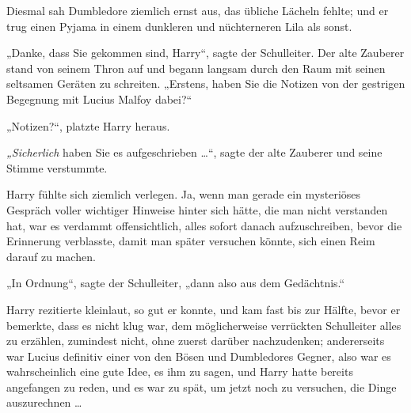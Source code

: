 Diesmal sah Dumbledore ziemlich ernst aus, das übliche Lächeln fehlte; und er trug einen Pyjama in einem dunkleren und nüchterneren Lila als sonst.

„Danke, dass Sie gekommen sind, Harry“, sagte der Schulleiter. Der alte Zauberer stand von seinem Thron auf und begann langsam durch den Raum mit seinen seltsamen Geräten zu schreiten.
„Erstens, haben Sie die Notizen von der gestrigen Begegnung mit Lucius Malfoy dabei?“

„Notizen?“, platzte Harry heraus.

\emph{„Sicherlich} haben Sie es aufgeschrieben …“, sagte der alte Zauberer und seine Stimme verstummte.

Harry fühlte sich ziemlich verlegen. Ja, wenn man gerade ein mysteriöses Gespräch voller wichtiger Hinweise hinter sich hätte, die man nicht verstanden hat, war es verdammt offensichtlich, alles sofort danach aufzuschreiben, bevor die Erinnerung verblasste, damit man später versuchen könnte, sich einen Reim darauf zu machen.

„In Ordnung“, sagte der Schulleiter, „dann also aus dem Gedächtnis.“

Harry rezitierte kleinlaut, so gut er konnte, und kam fast bis zur Hälfte, bevor er bemerkte, dass es nicht klug war, dem möglicherweise verrückten Schulleiter alles zu erzählen, zumindest nicht, ohne zuerst darüber nachzudenken; andererseits war Lucius definitiv einer von den Bösen und Dumbledores Gegner, also war es wahrscheinlich eine gute Idee, es ihm zu sagen, und Harry hatte bereits angefangen zu reden, und es war zu spät, um jetzt noch zu versuchen, die Dinge auszurechnen …

